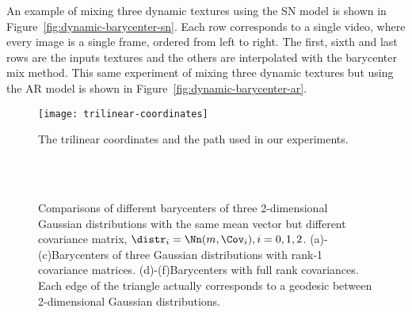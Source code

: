 An example of mixing three dynamic textures using the SN model is shown in Figure~\ref{fig:dynamic-barycenter-sn}. Each row corresponds to a single video, where every image is a single frame, ordered from left to right. The first, sixth and last rows are the inputs textures and the others are interpolated with the barycenter mix method.
This same experiment of mixing three dynamic textures but using the AR model is shown in Figure~\ref{fig:dynamic-barycenter-ar}.

\begin{figure}[ht!]
  \centering
  \texttt{[image: trilinear-coordinates]}
  \caption{The trilinear coordinates and the path used in our experiments.}
  \label{fig-trilinear-coordinates}
\end{figure}

\begin{figure}[ht!]
  \centering
  \\

  \\
  \caption{Comparisons of different barycenters of three 2-dimensional Gaussian distributions with the same mean vector but different covariance matrix, $\distr_i = \Nn(m, \Cov_i), i=0,1,2$.
  (a)-(c)Barycenters of three Gaussian distributions with rank-1 covariance matrices. (d)-(f)Barycenters with full rank covariances.
Each edge of the triangle actually corresponds to a geodesic between 2-dimensional Gaussian distributions.
  }
  \label{fig-barycenter-gaussian}
\end{figure}

